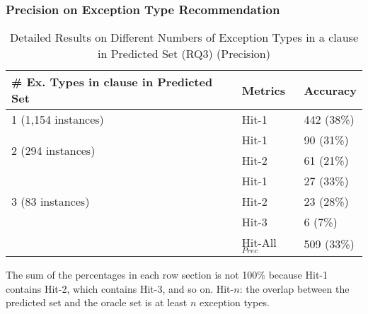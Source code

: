 
\subsubsection{{\bf Precision on Exception Type Recommendation}}
\label{sec:req3-precision}


\begin{table}[t]
  \caption{Detailed Results on Different Numbers of Exception Types in a  clause in Predicted Set (RQ3) (Precision)}
	\vspace{-12pt}
	{\small
	  \begin{center}
            \tabcolsep 2pt
			\renewcommand{\arraystretch}{1}
			\begin{tabular}{p{5cm}<{\centering}|p{1.4cm}<{\centering}|p{1.6cm}<{\centering}}
				\hline
				\# Ex. Types in \code{catch} clause in Predicted Set & Metrics & Accuracy \\
				\hline
				\multirow{1}{*}{1 (1,154 instances)}   & Hit-1  & 442 (38\%) \\
				\hline
				\multirow{2}{*}{2 (294 instances)}  & Hit-1   & 90 (31\%) \\
				& Hit-2       						& 61 (21\%) \\
				\hline
				\multirow{3}{*}{3 (83 instances)}  & Hit-1    & 27 (33\%) \\
				& Hit-2         					& 23 (28\%)\\
				& Hit-3         				  	& 6 (7\%) \\
                                \hline
                                & Hit-All$_{Prec}$ & 509 (33\%)\\
				\hline
			\end{tabular}
                        The sum of the percentages in each row section is not 100\% because Hit-1 contains Hit-2, which contains Hit-3, and so on. Hit-$n$: the overlap between the predicted set and the oracle set is at least $n$ exception types.
			\label{tab:precision-3}
		\end{center}
	}
\end{table}


